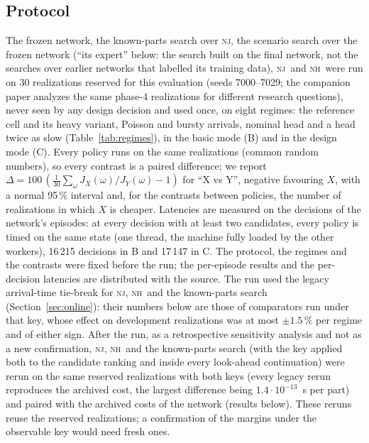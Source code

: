 \documentclass[11pt,a4paper]{article}
\theoremstyle{plain}
\theoremstyle{definition}
\theoremstyle{remark}
\newcommand{\nj}{\textsc{nj}}
\newcommand{\nh}{\textsc{nh}}
\newcommand{\tcross}{\tau_{\mathrm{cross}}}
\begin{document}
\subsection{Protocol}
The frozen network, the known-parts search over \nj, the scenario search over the
frozen network (``its expert'' below: the search built on the final network, not the
searches over earlier networks that labelled its training data), \nj\ and \nh\ were run on 30 realizations reserved for this
evaluation (seeds 7000--7029; the companion paper analyzes the same phase-4 realizations
for different research questions), never seen by any design decision and used once, on eight
regimes: the reference cell and its heavy variant, Poisson and bursty arrivals, nominal
head and a head twice as slow (Table~\ref{tab:regimes}), in the basic mode (B) and in the
design mode (C). Every policy runs on the same realizations (common random numbers), so
every contrast is a paired difference; we report $\Delta=100\,(\frac{1}{30}\sum_\omega
J_X(\omega)/J_Y(\omega)-1)$ for ``X vs Y'', negative favouring $X$, with a normal 95\,\%
interval and, for the contrasts between policies, the number of realizations in which $X$
is cheaper. Latencies are measured on the decisions of the network's episodes: at every
decision with at least two candidates, every policy is timed on the same state (one
thread, the machine fully loaded by the other workers), 16\,215 decisions in B and
17\,147 in C. The protocol, the regimes and the contrasts were fixed before the run; the
per-episode results and the per-decision latencies are distributed with the source.
The run used the legacy arrival-time tie-break for \nj, \nh\ and the known-parts search
(Section~\ref{sec:online}): their numbers below are those of comparators run under
that key, whose effect on development realizations was at most $\pm1.5$\,\% per
regime and of either sign. After the run, as a retrospective sensitivity analysis and
not as a new confirmation, \nj, \nh\ and the known-parts search (with the key applied
both to the candidate ranking and inside every look-ahead continuation) were rerun on the
same reserved realizations with both keys (every legacy rerun reproduces the archived
cost, the largest difference being $1.4\cdot10^{-13}$~s per part) and paired with the
archived costs of the network (results below). These reruns reuse the reserved
realizations; a confirmation of the margins under the observable key would need fresh
ones.

\begin{table}[t]
\centering\small
\caption{Regimes of the confirmatory evaluation and their physical scales ($\tcross$ is
the head's travel time across the conveyors); parts, penalized flow time, flow time,
blocking events and blocked conveyor-seconds are means per episode for \nj\ in B over the
30 realizations (seeds 7000--7029, the phase-4 realizations that the companion paper also
analyzes).}
\label{tab:regimes}
\resizebox{\linewidth}{!}{}
\end{table}
\end{document}
